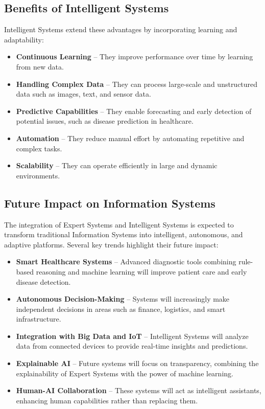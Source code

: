 \documentclass[12pt]{article}
\begin{document}
\subsection{Benefits of Intelligent Systems}

Intelligent Systems extend these advantages by incorporating learning and adaptability:

\begin{itemize}
    \item \textbf{Continuous Learning} -- They improve performance over time by learning from new data.
    
    \item \textbf{Handling Complex Data} -- They can process large-scale and unstructured data such as images, text, and sensor data.
    
    \item \textbf{Predictive Capabilities} -- They enable forecasting and early detection of potential issues, such as disease prediction in healthcare.
    
    \item \textbf{Automation} -- They reduce manual effort by automating repetitive and complex tasks.
    
    \item \textbf{Scalability} -- They can operate efficiently in large and dynamic environments.
\end{itemize}

\subsection{Future Impact on Information Systems}

The integration of Expert Systems and Intelligent Systems is expected to transform traditional Information Systems into intelligent, autonomous, and adaptive platforms. Several key trends highlight their future impact:

\begin{itemize}
    \item \textbf{Smart Healthcare Systems} -- Advanced diagnostic tools combining rule-based reasoning and machine learning will improve patient care and early disease detection.
    
    \item \textbf{Autonomous Decision-Making} -- Systems will increasingly make independent decisions in areas such as finance, logistics, and smart infrastructure.
    
    \item \textbf{Integration with Big Data and IoT} -- Intelligent Systems will analyze data from connected devices to provide real-time insights and predictions.
    
    \item \textbf{Explainable AI} -- Future systems will focus on transparency, combining the explainability of Expert Systems with the power of machine learning.
    
    \item \textbf{Human-AI Collaboration} -- These systems will act as intelligent assistants, enhancing human capabilities rather than replacing them.
\end{itemize}
\end{document}
